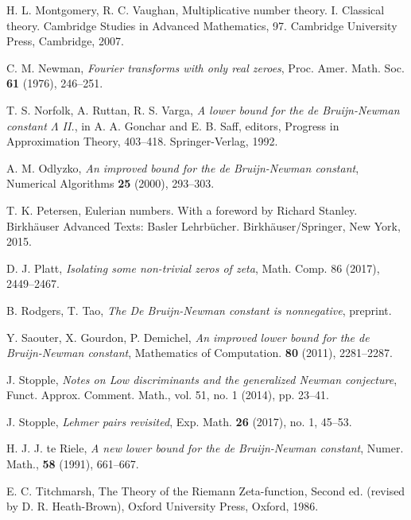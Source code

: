 \documentclass[a4paper,11pt,twoside]{amsart}
\begin{document}
\begin{thebibliography}{99}
H. L. Montgomery, R. C. Vaughan, Multiplicative number theory. I. Classical theory. Cambridge Studies in Advanced Mathematics, 97. Cambridge University Press, Cambridge, 2007.

C. M. Newman, \emph{Fourier transforms with only real zeroes}, Proc. Amer. Math. Soc. \textbf{61} (1976), 246--251.

T. S. Norfolk, A. Ruttan, R. S. Varga, \emph{A lower bound for the de Bruijn-Newman
constant $\Lambda$ II.}, in A. A. Gonchar and E. B. Saff, editors, Progress in Approximation
Theory, 403--418. Springer-Verlag, 1992.

A. M. Odlyzko, \emph{An improved bound for the de Bruijn-Newman constant}, Numerical Algorithms \textbf{25} (2000), 293--303.

T. K. Petersen, Eulerian numbers.  With a foreword by Richard Stanley. Birkh\"auser Advanced Texts: Basler Lehrb\"ucher. Birkh\"auser/Springer, New York, 2015.

D. J. Platt, \emph{Isolating some non-trivial zeros of zeta}, Math. Comp. 86 (2017), 2449--2467.

B. Rodgers, T. Tao, \emph{The De Bruijn-Newman constant is nonnegative}, preprint.

Y. Saouter, X. Gourdon, P. Demichel, \emph{An improved lower bound for the de Bruijn-Newman constant}, Mathematics of Computation. \textbf{80} (2011), 2281--2287. 

J. Stopple, \emph{Notes on Low discriminants and the generalized Newman conjecture}, Funct. Approx. Comment.
Math., vol. 51, no. 1 (2014), pp. 23--41.

J. Stopple, \emph{Lehmer pairs revisited}, Exp. Math. \textbf{26} (2017), no. 1, 45--53. 

H. J. J. te Riele, \emph{A new lower bound for the de Bruijn-Newman constant}, Numer. Math., \textbf{58} (1991), 661--667.

E. C. Titchmarsh, The Theory of the Riemann Zeta-function, Second ed. (revised by D. R. Heath-Brown), Oxford University Press, Oxford, 1986.	


\end{thebibliography} 
\end{document}
